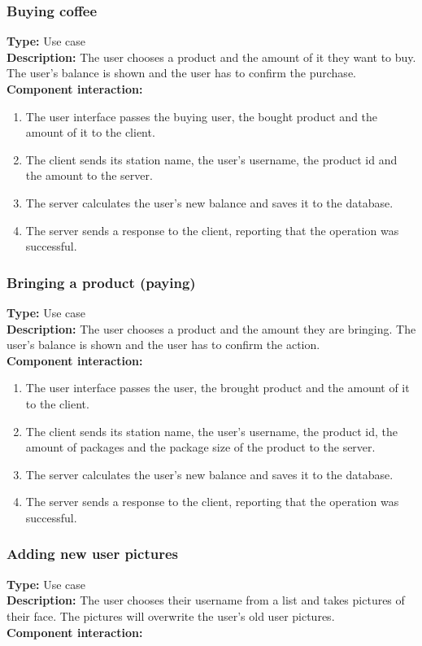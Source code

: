 \documentclass[11pt]{article}
\begin{document}
\subsubsection{Buying coffee}
\textbf{Type:} Use case\\
\textbf{Description:} The user chooses a product and the amount of it they want to buy. 
The user's balance is shown and the user has to confirm the purchase.\\
\textbf{Component interaction:}
\begin{enumerate} 
\item{The user interface passes the buying user, the bought product and the amount of it to the client.}
\item{The client sends its station name, the user's username, the product id and the amount to the server.}
\item{The server calculates the user's new balance and saves it to the database.}
\item{The server sends a response to the client, reporting that the operation was successful.}
\end{enumerate}

\subsubsection{Bringing a product (paying)}
\textbf{Type:} Use case\\
\textbf{Description:} The user chooses a product and the amount they are bringing. 
The user's balance is shown and the user has to confirm the action.\\
\textbf{Component interaction:}
\begin{enumerate} 
\item{The user interface passes the user, the brought product and the amount of it to the client.}
\item{The client sends its station name, the user's username, the product id, the amount of packages and the package size of the product to the server.}
\item{The server calculates the user's new balance and saves it to the database.}
\item{The server sends a response to the client, reporting that the operation was successful.}
\end{enumerate}

\subsubsection{Adding new user pictures}
\textbf{Type:} Use case\\
\textbf{Description:} The user chooses their username from a list and takes pictures of their face. 
The pictures will overwrite the user's old user pictures.\\
\textbf{Component interaction:}\\
\end{document}
